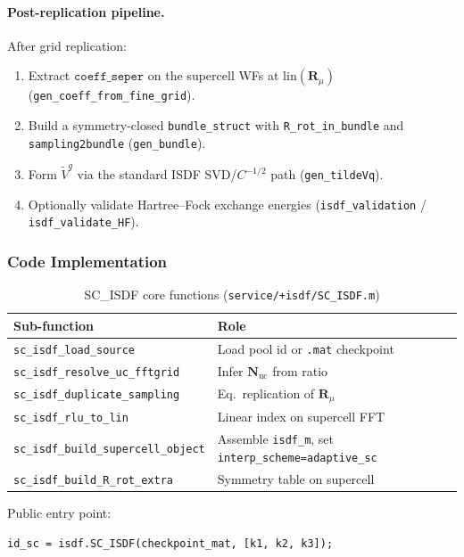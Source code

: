 \documentclass[11pt,a4paper]{article}
\begin{document}
\paragraph{Post-replication pipeline.}
After grid replication:
\begin{enumerate}
  \item Extract $\texttt{coeff\_seper}$ on the supercell WFs at $\mathrm{lin}(\mathbf R_\mu)$
        (\texttt{gen\_coeff\_from\_fine\_grid}).
  \item Build a symmetry-closed \texttt{bundle\_struct} with
        \texttt{R\_rot\_in\_bundle} and \texttt{sampling2bundle}
        (\texttt{gen\_bundle}).
  \item Form $\tilde V^q$ via the standard ISDF SVD/$C^{-1/2}$ path
        (\texttt{gen\_tildeVq}).
  \item Optionally validate Hartree--Fock exchange energies
        (\texttt{isdf\_validation} / \texttt{isdf\_validate\_HF}).
\end{enumerate}

\subsubsection{Code Implementation}

\begin{table}[h]
\centering
\caption{SC\_ISDF core functions (\texttt{service/+isdf/SC\_ISDF.m})}
\begin{tabular}{ll}
\toprule
Sub-function & Role \\
\midrule
\texttt{sc\_isdf\_load\_source} & Load pool id or \texttt{.mat} checkpoint \\
\texttt{sc\_isdf\_resolve\_uc\_fftgrid} & Infer $\mathbf N_{\mathrm{uc}}$ from ratio \\
\texttt{sc\_isdf\_duplicate\_sampling} & Eq.\ replication of $\mathbf R_\mu$ \\
\texttt{sc\_isdf\_rlu\_to\_lin} & Linear index on supercell FFT \\
\texttt{sc\_isdf\_build\_supercell\_object} & Assemble \texttt{isdf\_m}, set \texttt{interp\_scheme=adaptive\_sc} \\
\texttt{sc\_isdf\_build\_R\_rot\_extra} & Symmetry table on supercell \\
\bottomrule
\end{tabular}
\end{table}

Public entry point:
\begin{lstlisting}
id_sc = isdf.SC_ISDF(checkpoint_mat, [k1, k2, k3]);
\end{lstlisting}
\end{document}
